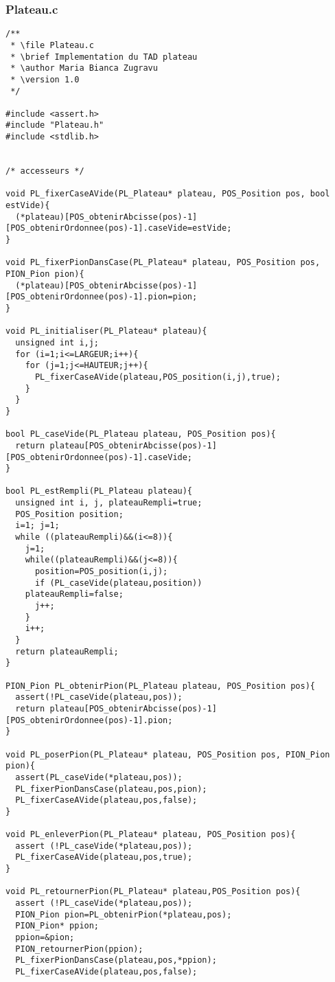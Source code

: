 \subsubsection{Plateau.c}
\begin{lstlisting}
/**
 * \file Plateau.c
 * \brief Implementation du TAD plateau
 * \author Maria Bianca Zugravu
 * \version 1.0
 */

#include <assert.h>
#include "Plateau.h"
#include <stdlib.h>


/* accesseurs */

void PL_fixerCaseAVide(PL_Plateau* plateau, POS_Position pos, bool estVide){
  (*plateau)[POS_obtenirAbcisse(pos)-1][POS_obtenirOrdonnee(pos)-1].caseVide=estVide;
}

void PL_fixerPionDansCase(PL_Plateau* plateau, POS_Position pos, PION_Pion pion){
  (*plateau)[POS_obtenirAbcisse(pos)-1][POS_obtenirOrdonnee(pos)-1].pion=pion;
}

void PL_initialiser(PL_Plateau* plateau){
  unsigned int i,j;
  for (i=1;i<=LARGEUR;i++){
    for (j=1;j<=HAUTEUR;j++){
      PL_fixerCaseAVide(plateau,POS_position(i,j),true);
    }
  }
}

bool PL_caseVide(PL_Plateau plateau, POS_Position pos){
  return plateau[POS_obtenirAbcisse(pos)-1][POS_obtenirOrdonnee(pos)-1].caseVide;
}

bool PL_estRempli(PL_Plateau plateau){
  unsigned int i, j, plateauRempli=true;
  POS_Position position;
  i=1; j=1;
  while ((plateauRempli)&&(i<=8)){
    j=1;
    while((plateauRempli)&&(j<=8)){
      position=POS_position(i,j);
      if (PL_caseVide(plateau,position))
	plateauRempli=false;
      j++;
    }
    i++;
  }
  return plateauRempli;
}

PION_Pion PL_obtenirPion(PL_Plateau plateau, POS_Position pos){
  assert(!PL_caseVide(plateau,pos));
  return plateau[POS_obtenirAbcisse(pos)-1][POS_obtenirOrdonnee(pos)-1].pion;
}

void PL_poserPion(PL_Plateau* plateau, POS_Position pos, PION_Pion pion){
  assert(PL_caseVide(*plateau,pos));
  PL_fixerPionDansCase(plateau,pos,pion);
  PL_fixerCaseAVide(plateau,pos,false);
}

void PL_enleverPion(PL_Plateau* plateau, POS_Position pos){
  assert (!PL_caseVide(*plateau,pos));
  PL_fixerCaseAVide(plateau,pos,true);
}

void PL_retournerPion(PL_Plateau* plateau,POS_Position pos){
  assert (!PL_caseVide(*plateau,pos));
  PION_Pion pion=PL_obtenirPion(*plateau,pos);
  PION_Pion* ppion;
  ppion=&pion;
  PION_retournerPion(ppion);
  PL_fixerPionDansCase(plateau,pos,*ppion);
  PL_fixerCaseAVide(plateau,pos,false);


\end{lstlisting}
